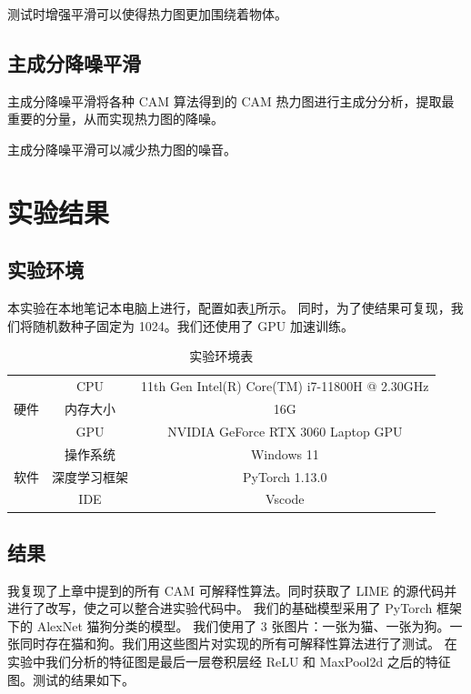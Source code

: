 \documentclass[supercite]{Experimental_Report}
\theoremstyle{definition}
\begin{document}
测试时增强平滑可以使得热力图更加围绕着物体。

\subsection{主成分降噪平滑}
主成分降噪平滑将各种 CAM 算法得到的 CAM 热力图进行主成分分析，提取最重要的分量，从而实现热力图的降噪。 

主成分降噪平滑可以减少热力图的噪音。


\section{实验结果}
\subsection{实验环境}
本实验在本地笔记本电脑上进行，配置如表\ref{服务器配置}所示。
同时，为了使结果可复现，我们将随机数种子固定为 1024。我们还使用了 GPU 加速训练。
\begin{table}[H]
	\centering
	\caption{实验环境表}
	  \begin{tabular}{c|c|c}
		\toprule
	  \multirow{3}[0]{*}{硬件} & CPU   & 11th Gen Intel(R) Core(TM) i7-11800H @ 2.30GHz \\
			& 内存大小    & 16G \\
			& GPU   & NVIDIA GeForce RTX 3060 Laptop GPU \\\hline
	  \multirow{3}[0]{*}{软件} & 操作系统  & Windows 11 \\
			& 深度学习框架 & PyTorch 1.13.0 \\
			& IDE   & Vscode \\\bottomrule
	  \end{tabular}
	\label{服务器配置}
\end{table}

\subsection{结果}
我复现了上章中提到的所有 CAM 可解释性算法。同时获取了 LIME 的源代码并进行了改写，使之可以整合进实验代码中。
我们的基础模型采用了 PyTorch 框架下的 AlexNet 猫狗分类的模型。
我们使用了 3 张图片：一张为猫、一张为狗。一张同时存在猫和狗。我们用这些图片对实现的所有可解释性算法进行了测试。
在实验中我们分析的特征图是最后一层卷积层经 ReLU 和 MaxPool2d 之后的特征图。测试的结果如下。
\end{document}
